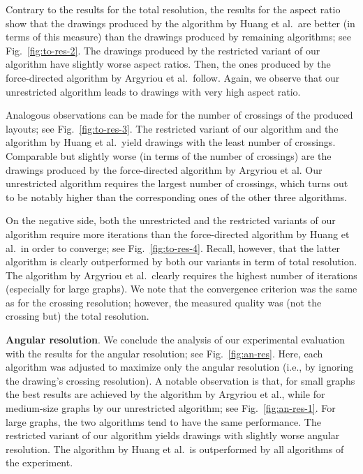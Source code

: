 \documentclass{comjnl}
\newcommand{\myparagraph}[1]{\medskip\noindent\textbf{#1}.}
\begin{document}
Contrary to the results for the total resolution, the results for the aspect ratio show that the drawings produced by the algorithm by Huang et al.\ are better (in terms of this measure) than the drawings produced by remaining algorithms; see Fig.~\ref{fig:to-res-2}. 
The drawings produced by the restricted variant of our algorithm have slightly worse aspect ratios. Then, the ones produced by the force-directed algorithm by Argyriou et al.\ follow. Again, we observe that our unrestricted algorithm leads to drawings with very high aspect ratio.

Analogous observations can be made for the number of crossings of the produced layouts; see Fig.~\ref{fig:to-res-3}. The restricted variant of our algorithm and the algorithm by Huang et al.\ yield drawings with the least number of crossings. Comparable but slightly worse (in terms of the number of crossings) are the drawings produced by the force-directed algorithm by Argyriou et al. Our unrestricted algorithm requires the largest number of crossings, which turns out to be notably higher than the corresponding ones of the other three algorithms.

On the negative side, both the unrestricted and the restricted variants of our algorithm require more iterations than the force-directed algorithm by Huang et al.\ in order to converge; see Fig.~\ref{fig:to-res-4}. Recall, however, that the latter algorithm is clearly outperformed by both our variants in term of total resolution. The algorithm by Argyriou et al.\ clearly requires the highest number of iterations (especially for large graphs). We note that the convergence criterion was the same as for the crossing resolution; however, the measured quality was (not the crossing but) the total resolution.

\myparagraph{Angular resolution} We conclude the analysis of our experimental evaluation with the results for the angular resolution; see Fig.~\ref{fig:an-res}. Here, each algorithm was adjusted  to maximize only the angular resolution (i.e., by ignoring the drawing's crossing resolution). A notable observation is that, for small graphs the best results are achieved by the algorithm by Argyriou et al., while for medium-size graphs by our unrestricted algorithm; see Fig.~\ref{fig:an-res-1}. For large graphs, the two algorithms tend to have the same performance. The restricted variant of our algorithm yields drawings with slightly worse angular resolution. The algorithm by Huang et al.\ is outperformed by all algorithms of the experiment.
\end{document}
